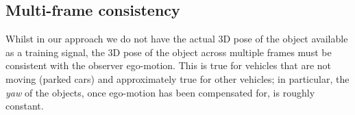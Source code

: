 
\subsection{Multi-frame consistency}



Whilst in our approach we do not have the actual 3D pose of the object available as a training signal, the 3D pose of the object across multiple frames must be consistent with the observer ego-motion.
This is true for vehicles that are not moving (parked cars) and approximately true for other vehicles; in particular, the \emph{yaw} of the objects, once ego-motion has been compensated for, is roughly constant.


